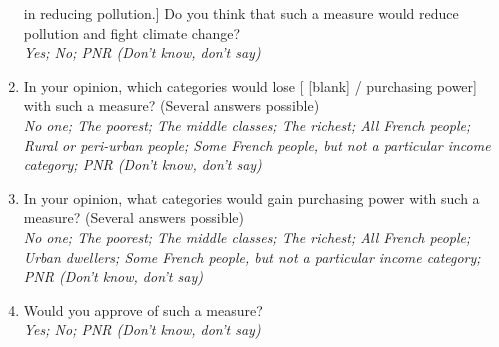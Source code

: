 \documentclass[12pt]{article} %
\begin{document}
\begin{appendices}
\begin{enumerate}[resume,leftmargin=*]
in reducing pollution.{]} Do you think that such a measure would reduce
pollution and fight climate change? \emph{}\\ 
\emph{Yes; No; PNR (Don't know, don't say)}
\item In your opinion, which categories would lose {[} {[}blank{]} / purchasing
power{]} with such a measure? (Several answers possible) \emph{}\\
\emph{No one; The poorest; The middle classes; The richest; All French
people; Rural or peri-urban people; Some French people, but not a
particular income category; PNR (Don't know, don't say)} 
\item In your opinion, what categories would gain purchasing power with
such a measure? (Several answers possible) \emph{}\\
\emph{No one; The poorest; The middle classes; The richest; All French
people; Urban dwellers; Some French people, but not a particular income
category; PNR (Don't know, don't say)} 
\item Would you approve of such a measure?
\emph{}\\
\emph{Yes; No; PNR (Don't know, don't say)} 
\end{enumerate}


\end{appendices}
\end{document}
